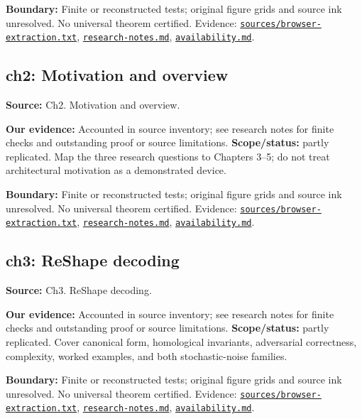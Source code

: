 \documentclass[11pt]{article}
\begin{document}
\textbf{Boundary:} Finite or reconstructed tests; original figure grids and source ink unresolved. No universal theorem certified. Evidence: \href{https://github.com/alectionary/vibe-math/blob/master/formalization/quintavalle-hgp/sources/browser-extraction.txt}{\nolinkurl{sources/browser-extraction.txt}}, \href{https://github.com/alectionary/vibe-math/blob/master/formalization/quintavalle-hgp/research-notes.md}{\nolinkurl{research-notes.md}}, \href{https://github.com/alectionary/vibe-math/blob/master/formalization/quintavalle-hgp/availability.md}{\nolinkurl{availability.md}}.
\subsection{ch2: Motivation and overview}
\label{claim:ch2}
\textbf{Source:} Ch2. Motivation and overview.

\textbf{Our evidence:} Accounted in source inventory; see research notes for finite checks and outstanding proof or source limitations. \textbf{Scope/status:} partly replicated. Map the three research questions to Chapters 3--5; do not treat architectural motivation as a demonstrated device.

\textbf{Boundary:} Finite or reconstructed tests; original figure grids and source ink unresolved. No universal theorem certified. Evidence: \href{https://github.com/alectionary/vibe-math/blob/master/formalization/quintavalle-hgp/sources/browser-extraction.txt}{\nolinkurl{sources/browser-extraction.txt}}, \href{https://github.com/alectionary/vibe-math/blob/master/formalization/quintavalle-hgp/research-notes.md}{\nolinkurl{research-notes.md}}, \href{https://github.com/alectionary/vibe-math/blob/master/formalization/quintavalle-hgp/availability.md}{\nolinkurl{availability.md}}.
\subsection{ch3: ReShape decoding}
\label{claim:ch3}
\textbf{Source:} Ch3. ReShape decoding.

\textbf{Our evidence:} Accounted in source inventory; see research notes for finite checks and outstanding proof or source limitations. \textbf{Scope/status:} partly replicated. Cover canonical form, homological invariants, adversarial correctness, complexity, worked examples, and both stochastic-noise families.

\textbf{Boundary:} Finite or reconstructed tests; original figure grids and source ink unresolved. No universal theorem certified. Evidence: \href{https://github.com/alectionary/vibe-math/blob/master/formalization/quintavalle-hgp/sources/browser-extraction.txt}{\nolinkurl{sources/browser-extraction.txt}}, \href{https://github.com/alectionary/vibe-math/blob/master/formalization/quintavalle-hgp/research-notes.md}{\nolinkurl{research-notes.md}}, \href{https://github.com/alectionary/vibe-math/blob/master/formalization/quintavalle-hgp/availability.md}{\nolinkurl{availability.md}}.
\end{document}
